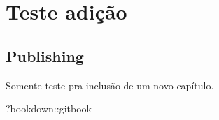 \documentclass[
]{book}
\newenvironment{Shaded}{\begin{snugshade}}{\end{snugshade}}
\newcommand{\NormalTok}[1]{#1}
\newcommand{\SpecialCharTok}[1]{\textcolor[rgb]{0.00,0.00,0.00}{#1}}
\theoremstyle{definition}
\theoremstyle{definition}
\theoremstyle{definition}
\theoremstyle{definition}
\theoremstyle{remark}
\begin{document}
\hypertarget{teste-adiuxe7uxe3o}{%
\chapter{Teste adição}\label{teste-adiuxe7uxe3o}}

\hypertarget{publishing-1}{%
\section{Publishing}\label{publishing-1}}

Somente teste pra inclusão de um novo capítulo.

\begin{Shaded}
\begin{Highlighting}[]
\NormalTok{?bookdown}\SpecialCharTok{::}\NormalTok{gitbook}
\end{Highlighting}
\end{Shaded}


  
\end{document}
